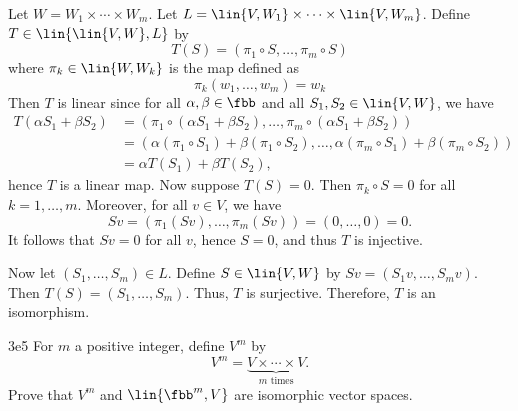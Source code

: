 \begin{sol}
    Let $W = W_1 \times \cdots \times W_m$.
	Let $L = \lin{V, W_1} \times \cdots \times \lin{V, W_m}$.
	Define $T \in \lin{\lin{V, W}, L}$ by
    \[
    	T(S) = (\pi_1 \circ S, \ldots, \pi_m \circ S)
    \]
    where $\pi_k \in \lin{W, W_k}$ is the map defined as
    \[
    	\pi_k(w_1, \ldots, w_m) = w_k
    \]
    Then $T$ is linear since for all $\alpha, \beta \in \fbb$ and all $S_1, S_2 \in \lin{V, W}$, we have
    \begin{align*}
        T(\alpha S_1 + \beta S_2) & = (\pi_1 \circ (\alpha S_1 + \beta S_2), \ldots, \pi_m \circ (\alpha S_1 + \beta S_2)) \\
        & = (\alpha (\pi_1 \circ S_1) + \beta (\pi_1 \circ S_2), \ldots, \alpha (\pi_m \circ S_1) + \beta (\pi_m \circ S_2))\\
        & = 	\alpha T(S_1) + \beta T(S_2),
    \end{align*}
    hence $T$ is a linear map.
	Now suppose $T(S) = 0$.
	Then $\pi_k \circ S = 0$ for all $k = 1, \ldots, m$.
	Moreover, for all $v \in V$, we have
    \[
    	S v = (\pi_1(Sv), \ldots, \pi_m(Sv)) = (0, \ldots, 0) = 0.
    \]
    It follows that $S v = 0$ for all $v$, hence $S = 0$, and thus $T$ is injective.

    Now let $(S_1, \ldots, S_m) \in L$.
	Define $S \in \lin{V, W}$ by $S v = (S_1 v, \ldots, S_m v)$.
	Then $T(S) = (S_1, \ldots, S_m)$.
	Thus, $T$ is surjective.
	Therefore, $T$ is an isomorphism.
\end{sol}

\begin{exercise}{3e5}
    For $m$ a positive integer, define $V^m$ by
    \[
    	V^m = \underbrace{V \times \cdots \times V}_{m \text{ times}}.
    \]
    Prove that $V^m$ and $\lin{\fbb^m, V}$ are isomorphic vector spaces.
\end{exercise}

